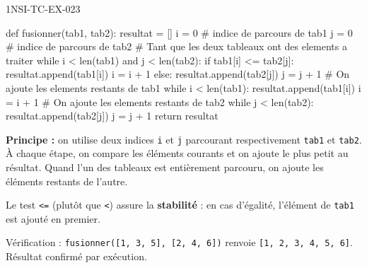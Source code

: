 \begin{corrige}{1NSI-TC-EX-023}
\begin{python}
def fusionner(tab1, tab2):
    resultat = []
    i = 0  # indice de parcours de tab1
    j = 0  # indice de parcours de tab2
    # Tant que les deux tableaux ont des elements a traiter
    while i < len(tab1) and j < len(tab2):
        if tab1[i] <= tab2[j]:
            resultat.append(tab1[i])
            i = i + 1
        else:
            resultat.append(tab2[j])
            j = j + 1
    # On ajoute les elements restants de tab1
    while i < len(tab1):
        resultat.append(tab1[i])
        i = i + 1
    # On ajoute les elements restants de tab2
    while j < len(tab2):
        resultat.append(tab2[j])
        j = j + 1
    return resultat
\end{python}

\textbf{Principe :} on utilise deux indices \lstinline{i} et \lstinline{j} parcourant respectivement \lstinline{tab1} et \lstinline{tab2}. À chaque étape, on compare les éléments courants et on ajoute le plus petit au résultat. Quand l'un des tableaux est entièrement parcouru, on ajoute les éléments restants de l'autre.

Le test \lstinline{<=} (plutôt que \lstinline{<}) assure la \textbf{stabilité} : en cas d'égalité, l'élément de \lstinline{tab1} est ajouté en premier.

Vérification : \lstinline{fusionner([1, 3, 5], [2, 4, 6])} renvoie \lstinline{[1, 2, 3, 4, 5, 6]}. Résultat confirmé par exécution.
\end{corrige}
